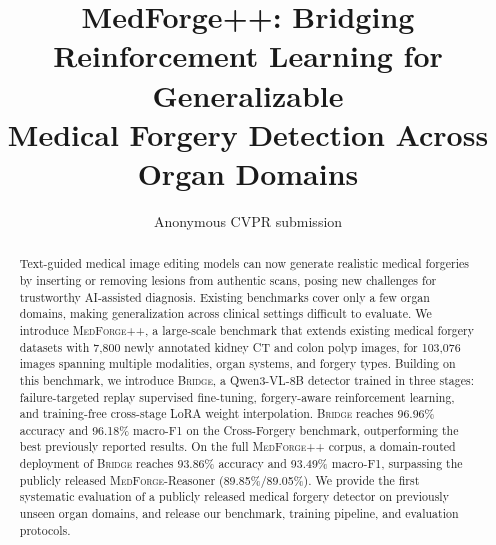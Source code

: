 \documentclass[10pt,twocolumn,letterpaper]{article}
\title{MedForge++: Bridging Reinforcement Learning for Generalizable\\Medical Forgery Detection Across Organ Domains}
\author{Anonymous CVPR submission}
\newcommand{\bridge}{\textsc{Bridge}}
\newcommand{\medforge}{\textsc{MedForge}}
\newcommand{\medforgepp}{\textsc{MedForge++}}
\begin{document}
\maketitle
\begin{abstract}
Text-guided medical image editing models can now generate realistic medical forgeries by inserting or removing lesions from authentic scans, posing new challenges for trustworthy AI-assisted diagnosis. Existing benchmarks cover only a few organ domains, making generalization across clinical settings difficult to evaluate. We introduce \medforgepp{}, a large-scale benchmark that extends existing medical forgery datasets with 7{,}800 newly annotated kidney CT and colon polyp images, for 103{,}076 images spanning multiple modalities, organ systems, and forgery types. Building on this benchmark, we introduce \bridge{}, a Qwen3-VL-8B detector trained in three stages: failure-targeted replay supervised fine-tuning, forgery-aware reinforcement learning, and training-free cross-stage LoRA weight interpolation. \bridge{} reaches 96.96\% accuracy and 96.18\% macro-F1 on the Cross-Forgery benchmark, outperforming the best previously reported results. On the full \medforgepp{} corpus, a domain-routed deployment of \bridge{} reaches 93.86\% accuracy and 93.49\% macro-F1, surpassing the publicly released \medforge{}-Reasoner (89.85\%/89.05\%). We provide the first systematic evaluation of a publicly released medical forgery detector on previously unseen organ domains, and release our benchmark, training pipeline, and evaluation protocols.
\end{abstract}
\end{document}
